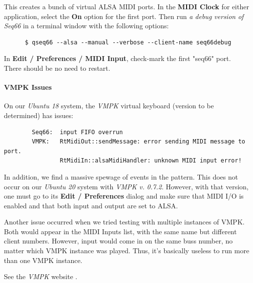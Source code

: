    This creates a bunch of virtual ALSA MIDI ports.
   In the \textbf{MIDI Clock} for either application,
   select the \textbf{On} option for the first port.
   Then run \textsl{a debug version of Seq66} in a terminal window
   with the following options:

   \begin{verbatim}
      $ qseq66 --alsa --manual --verbose --client-name seq66debug
   \end{verbatim}

   In
   \textbf{Edit / Preferences / MIDI Input}, check-mark the first
   "seq66" port.  There should be no need to restart.

\paragraph{VMPK Issues}
\label{paragraph:alsa_testing_vmpk_issues}

   On our \textsl{Ubuntu 18} system, the \textsl{VMPK} virtual keyboard
   (version to be determined) has issues:

   \begin{verbatim}
        Seq66:  input FIFO overrun
        VMPK:   RtMidiOut::sendMessage: error sending MIDI message to port.
                RtMidiIn::alsaMidiHandler: unknown MIDI input error!
   \end{verbatim}

   In addition, we find a massive spewage of events in the pattern.
   This does not occur on our \textsl{Ubuntu 20} system with
   \textsl{VMPK v. 0.7.2}.
   However, with that version, one must go to its \textbf{Edit / Preferences}
   dialog and make sure that MIDI I/O is enabled and that both input
   and output are set to ALSA.

   Another issue occurred when we tried testing with multiple instances
   of VMPK. Both would appear in the MIDI Inputs list, with the same name but
   different client numbers.  However, input would come in on the same buss
   number, no matter which VMPK instance was played.
   Thus, it's basically useless to run more than one VMPK instance.

   See the \textsl{VMPK} website \cite{vmpk}.

